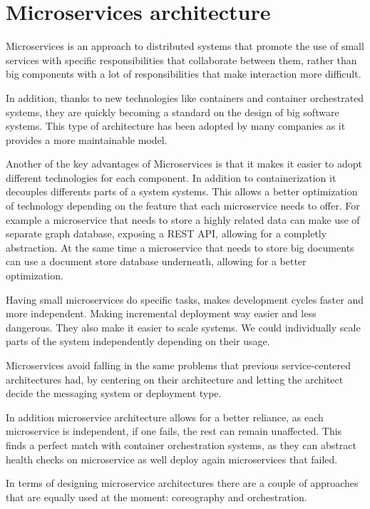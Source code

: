 \section{Microservices architecture}


Microservices is an approach to distributed systems that promote the use of small services with specific responsibilities that collaborate between them, rather than big components with a lot of responsibilities that make interaction more difficult.
 
In addition, thanks to new technologies like containers and container orchestrated systems, they are quickly becoming a standard on the design of big software systems. This type of architecture has been adopted by many companies as it provides a more maintainable model. 
 
Another of the key advantages of Microservices is that it makes it easier to adopt different technologies for each component. In addition to containerization it decouples differents parts of a system systems. This allows a better optimization of technology depending on the feature that each microservice needs to offer. For example a microservice that needs to store a highly related data can make use of separate graph database, exposing a REST API, allowing for a completly abstraction. At the same time a microservice that needs to store big documents can use a document store database underneath, allowing for a better optimization. 
 
 
 
Having small microservices do specific tasks, makes development cycles faster and more independent. Making incremental deployment way easier and less dangerous. They also make it easier to scale systems. We could individually scale parts of the system independently depending on their usage.
 
Microservices avoid falling in the same problems that previous service-centered architectures had, by centering on their architecture and letting the architect decide the messaging system or deployment type.
 
In addition microservice architecture allows for a better reliance, as each microservice is independent, if one fails, the rest can remain unaffected. This finds a perfect match with container orchestration systems, as they can abstract health checks on microservice as well deploy again microservices that failed.
 
In terms of designing microservice architectures there are a couple of approaches that are equally used at the moment: coreography and orchestration.

